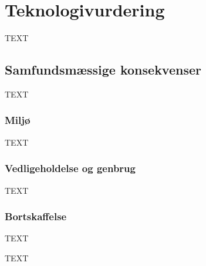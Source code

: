 \section{Teknologivurdering}
\label{sec:teknologivurdering}
TEXT
\subsection{Samfundsmæssige konsekvenser }
\label{sec:tek-samfund}
TEXT 
\subsubsection{Miljø}
\label{sec:tek-miljo}
TEXT
\subsubsection{Vedligeholdelse og genbrug}
TEXT
\subsubsection{Bortskaffelse}
TEXT
\begin{tail}
TEXT
\end{tail}
